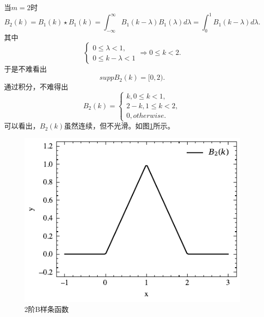 当$m=2$时
\begin{equation*}
    B_{2}(k)=B_{1}(k)\star B_{1}(k)=\int_{-\infty}^{\infty}B_{1}(k-\lambda)B_{1}(\lambda)d\lambda=
\int_{0}^{1}B_{1}(k-\lambda)d\lambda .
\end{equation*}
其中
\begin{equation*}
    \left\{\begin{matrix} 
0 \le \lambda <1,\\
0\le k-\lambda <1
\end{matrix}\right. 
\Rightarrow 0\le k <2.
\end{equation*}
于是不难看出
\begin{equation}
    supp B_2(k)=[0,2).
\end{equation}
通过积分，不难得出
\begin{equation}
B_2(k)=
    \left\{\begin{matrix} 
k,0\le k<1,\\
2-k,1\le k<2,\\
0,otherwise.
\end{matrix}\right. 
\end{equation}
可以看出，$B_2(k)$虽然连续，但不光滑。如图\ref{B2}所示。
\begin{figure}[htbp]
    \centering
    \includegraphics[width=0.76\linewidth]{figures/B-splin/B2.pdf}
    \caption{2阶B样条函数}
    \label{B2}
\end{figure}

